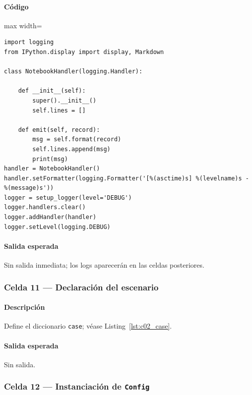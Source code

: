 \paragraph{Código}
\begin{listing}[H]
\caption{Celda 9: configuración de logs interactivos}
\begin{adjustbox}{max width=\textwidth}
\begin{minipage}{\textwidth}
\begin{verbatim}
import logging
from IPython.display import display, Markdown

class NotebookHandler(logging.Handler):

    def __init__(self):
        super().__init__()
        self.lines = []

    def emit(self, record):
        msg = self.format(record)
        self.lines.append(msg)
        print(msg)
handler = NotebookHandler()
handler.setFormatter(logging.Formatter('[%(asctime)s] %(levelname)s - %(message)s'))
logger = setup_logger(level='DEBUG')
logger.handlers.clear()
logger.addHandler(handler)
logger.setLevel(logging.DEBUG)
\end{verbatim}
\end{minipage}
\end{adjustbox}
\end{listing}
\paragraph{Salida esperada} Sin salida inmediata; los logs aparecerán en las celdas posteriores.

\subsubsection*{Celda 11 — Declaración del escenario}
\paragraph{Descripción} Define el diccionario \texttt{case}; véase Listing~\ref{lst:c02_case}.
\paragraph{Salida esperada} Sin salida.

\subsubsection*{Celda 12 — Instanciación de \texttt{Config}}
